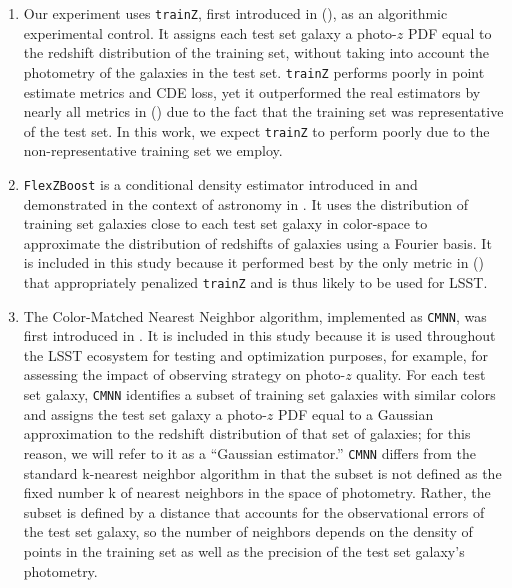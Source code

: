 \documentclass[fleqn,usenatbib,useAMS]{mnras}
\newcommand{\citeDCt}{\citetalias{Schmidt20} (\citeyear{Schmidt20})\xspace}
\begin{document}
\begin{enumerate}
    \item 
Our experiment uses \texttt{trainZ}, first introduced in \citeDCt, as an algorithmic experimental control. 
It assigns each test set galaxy a photo-$z$ PDF equal to the redshift distribution of the training set, without taking into account the photometry of the galaxies in the test set. 
{\texttt{trainZ} performs poorly in point estimate metrics and CDE loss}, yet it outperformed the real estimators by nearly all metrics in \citeDCt due to {the fact that the training set was representative of the test set. In this work, we expect \texttt{trainZ} to perform poorly due to the non-representative training set we employ. }
%
%
\item \texttt{FlexZBoost} is a conditional density estimator introduced in \citet{Izbicki17} and demonstrated in the context of astronomy in \citet{Dalmasso20}.
It uses the distribution of training set galaxies close to each test set galaxy in color-space to approximate the distribution of redshifts of galaxies using a Fourier basis.
It is included in this study because it performed best by the only metric in \citeDCt that appropriately penalized \texttt{trainZ} and is thus likely to be used for LSST.
%
%
\item The Color-Matched Nearest Neighbor algorithm, implemented as \texttt{CMNN}, was first introduced in \citet{Graham18}.
It is included in this study because it is used throughout the \textsc{LSST} ecosystem for testing and optimization purposes, for example, for assessing the impact of observing strategy on photo-$z$ quality.
For each test set galaxy, \texttt{CMNN} identifies a subset of training set galaxies with similar colors and assigns the test set galaxy a photo-$z$ PDF equal to a Gaussian approximation to the redshift distribution of that set of galaxies;
for this reason, we will refer to it as a ``Gaussian estimator.''
\texttt{CMNN} differs from the standard k-nearest neighbor algorithm in that the subset is not defined as the fixed number k of nearest neighbors in the space of photometry.
Rather, the subset is defined by a distance that accounts for the observational errors of the test set galaxy, so the number of neighbors depends on the density of points in the training set as well as the precision of the test set galaxy's photometry. 

\end{enumerate}
\end{document}
